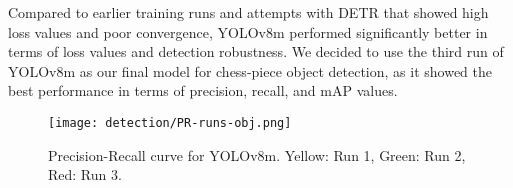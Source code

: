 Compared to earlier training runs and attempts with DETR that showed high loss values and poor convergence, YOLOv8m performed significantly better in terms of loss values and detection robustness.
We decided to use the third run of YOLOv8m as our final model for chess-piece object detection, as it showed the best performance in terms of precision, recall, and mAP values.

\begin{figure}[ht]
\centering
\texttt{[image: detection/PR-runs-obj.png]}
\caption{Precision-Recall curve for YOLOv8m. Yellow: Run 1, Green: Run 2, Red: Run 3. }
\label{fig:chess-detection}
\end{figure}
